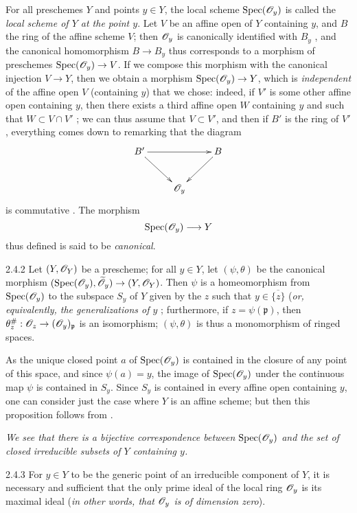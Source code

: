 \documentclass[10pt,oneside]{book}
\begin{document}
For all preschemes $Y$ and points $y\in Y$, the local scheme ${\mathop{\mathrm{Spec}}\nolimits}(\mathscr{O}_y)$
is called the \emph{local scheme of $Y$ at the point $y$}. Let $V$ be an affine
open of $Y$ containing $y$, and $B$ the ring of the affine scheme $V$; then
$\mathscr{O}_y$ is canonically identified with $B_y$ , and the canonical
homomorphism $B\to B_y$ thus corresponds  to a morphism of preschemes
${\mathop{\mathrm{Spec}}\nolimits}(\mathscr{O}_y)\to V$.  If we compose this morphism with the canonical injection
$V\to Y$, then we obtain a morphism ${\mathop{\mathrm{Spec}}\nolimits}(\mathscr{O}_y)\to Y$, which is
\emph{independent} of the affine open $V$ (containing $y$) that we chose:
indeed, if $V'$ is some other affine open containing $y$, then there exists a
third affine open $W$ containing $y$ and such that $W\subset V\cap V'$ ;
we can thus assume that $V\subset V'$, and then if $B'$ is the ring of $V'$,
everything comes down to remarking that the diagram
\[
  \xymatrix{
    B'\ar[rr]\ar[dr] & & B\ar[dl]\\
    & \OO_y &
  }
\]
is commutative . The morphism
\[
  {\mathop{\mathrm{Spec}}\nolimits}(\mathscr{O}_y)\longrightarrow Y
\]
thus defined is said to be \emph{canonical}.
    
\begin{envs}[Proposition]{2.4.2}
\label{prop-1.2.4.2}
Let $(Y,\mathscr{O}_Y)$ be a prescheme; for all $y\in Y$, let $(\psi,\theta)$ be the canonical
morphism $({\mathop{\mathrm{Spec}}\nolimits}(\mathscr{O}_y),\widetilde{\mathscr{O}}_y)\to(Y,\mathscr{O}_Y)$. Then $\psi$ is a homeomorphism
from ${\mathop{\mathrm{Spec}}\nolimits}(\mathscr{O}_y)$ to the subspace $S_y$ of $Y$ given by the $z$ such that
$y\in\overline{\{z\}}$ (\emph{or, equivalently, the generalizations of $y$
}; furthermore, if $z=\psi(\mathfrak{p})$, then
$\theta_z^\#:\mathscr{O}_z\to(\mathscr{O}_y)_\mathfrak{p}$ is an isomorphism; $(\psi,\theta)$
is thus a monomorphism of ringed spaces.
\end{envs}
    
As the unique closed point $a$ of ${\mathop{\mathrm{Spec}}\nolimits}(\mathscr{O}_y)$ is contained in the closure of any
point of this space, and since $\psi(a)=y$, the image of ${\mathop{\mathrm{Spec}}\nolimits}(\mathscr{O}_y)$ under
the continuous map $\psi$ is contained in $S_y$. Since $S_y$ is contained in
every affine open containing $y$, one can consider just the case where $Y$ is an
affine scheme; but then this proposition follows from .
    
\emph{We see  that there is a bijective correspondence between
${\mathop{\mathrm{Spec}}\nolimits}(\mathscr{O}_y)$ and the set of closed irreducible subsets of $Y$ containing $y$.}
    
\begin{envs}[Corollary]{2.4.3}
\label{cor-1.2.4.3}
For $y\in Y$ to be the generic point of an
irreducible component of $Y$, it is necessary and sufficient that the only prime
ideal of the local ring $\mathscr{O}_y$ is its maximal ideal (\emph{in other words, that
$\mathscr{O}_y$ is of \emph{dimension zero}}).
\end{envs}
    
\end{document}
